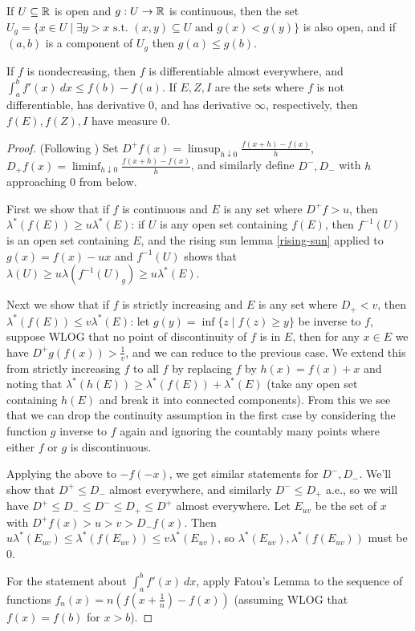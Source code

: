 \documentclass[letterpaper,11pt]{report}
\begin{document}
\begin{lem}\label{rising-sun} If $U \subseteq \mathbb{R}$ is open and $g : U \rightarrow \mathbb{R}$ is continuous, then the set $U_g = \{x \in U \mid \exists y > x \text{ s.t. } (x,y) \subseteq U \text{ and } g(x) < g(y)\}$ is also open, and if $(a,b)$ is a component of $U_g$ then $g(a) \le g(b)$.
\end{lem}

\begin{thm}[Lebesgue]\label{lebesgue-monotone} If $f$ is nondecreasing, then $f$ is differentiable almost everywhere, and $\int_a^b f'(x)\ dx \le f(b) - f(a)$. If $E,Z,I$ are the sets where $f$ is not differentiable, has derivative $0$, and has derivative $\infty$, respectively, then $f(E), f(Z), I$ have measure $0$.
\end{thm}
\begin{proof} (Following \cite{faure-lebesgue}) Set $D^+f(x) = \limsup_{h \downarrow 0} \frac{f(x+h)-f(x)}{h}$, $D_+f(x) = \liminf_{h \downarrow 0} \frac{f(x+h)-f(x)}{h}$, and similarly define $D^-, D_-$ with $h$ approaching $0$ from below.

First we show that if $f$ is continuous and $E$ is any set where $D^+f > u$, then $\lambda^*(f(E)) \ge u\lambda^*(E)$: if $U$ is any open set containing $f(E)$, then $f^{-1}(U)$ is an open set containing $E$, and the rising sun lemma \ref{rising-sun} applied to $g(x) = f(x) - ux$ and $f^{-1}(U)$ shows that $\lambda(U) \ge u\lambda(f^{-1}(U)_g) \ge u\lambda^*(E)$.

Next we show that if $f$ is strictly increasing and $E$ is any set where $D_+ < v$, then $\lambda^*(f(E)) \le v\lambda^*(E)$: let $g(y) = \inf\{z \mid f(z) \ge y\}$ be inverse to $f$, suppose WLOG that no point of discontinuity of $f$ is in $E$, then for any $x \in E$ we have $D^+g(f(x)) > \frac{1}{v}$, and we can reduce to the previous case. We extend this from strictly increasing $f$ to all $f$ by replacing $f$ by $h(x) = f(x)+x$ and noting that $\lambda^*(h(E)) \ge \lambda^*(f(E)) + \lambda^*(E)$ (take any open set containing $h(E)$ and break it into connected components). From this we see that we can drop the continuity assumption in the first case by considering the function $g$ inverse to $f$ again and ignoring the countably many points where either $f$ or $g$ is discontinuous.

Applying the above to $-f(-x)$, we get similar statements for $D^-, D_-$. We'll show that $D^+ \le D_-$ almost everywhere, and similarly $D^- \le D_+$ a.e., so we will have $D^+ \le D_- \le D^- \le D_+ \le D^+$ almost everywhere. Let $E_{uv}$ be the set of $x$ with $D^+f(x) > u > v > D_-f(x)$. Then $u\lambda^*(E_{uv}) \le \lambda^*(f(E_{uv})) \le v\lambda^*(E_{uv})$, so $\lambda^*(E_{uv}), \lambda^*(f(E_{uv}))$ must be $0$.

For the statement about $\int_a^b f'(x)\ dx$, apply Fatou's Lemma to the sequence of functions $f_n(x) = n(f(x+\frac{1}{n}) - f(x))$ (assuming WLOG that $f(x) = f(b)$ for $x > b$).
\end{proof}
\end{document}
